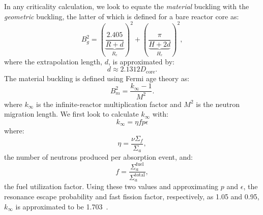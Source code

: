 \documentclass{anstrans}
\begin{document}
    In any criticality calculation, we look to equate the \textit{material} buckling with the \textit{geometric} buckling, the latter of which is defined for a bare reactor core as:
    \begin{equation}
        \label{geometric buckling}
        B_g^2 = \left( \frac{2.405}{\underbrace{R+d}_{R_e}} \right)^2 + \left( \frac{\pi }{\underbrace{H+2d}_{H_e}} \right)^2,
    \end{equation}
    where the extrapolation length, $d$, is approximated by:
    \begin{equation}
        \label{extrapolation length}
        d \approx 2.1312 D_{\text{core}}.
    \end{equation}
    The material buckling is defined using Fermi age theory as:
    \begin{equation}
        \label{material buckling}
        B_m^2 = \frac{k_{\infty }-1}{M^2}.
    \end{equation}
    where $k_{\infty}$ is the infinite-reactor multiplication factor and $M^2$ is the neutron migration length.
    We first look to calculate $k_{\infty}$ with:
    \begin{equation}
        \label{k inifinity}
        k_{\infty}= \eta f p \epsilon
    \end{equation}
    where:
    \begin{equation}
        \label{eta}
        \eta = \frac{\nu \Sigma_f }{\Sigma_a},
    \end{equation}
    the number of neutrons produced per absorption event, and:
    \begin{equation}
        \label{fuel uilization}
        f = \frac{\Sigma_a^{\text{fuel}}}{\Sigma_a^{\text{total}}},
    \end{equation}
    the fuel utilization factor.
    Using these two values and approximating $p$ and $\epsilon$, the resonance escape probability and fast fission factor, respectively, as 1.05 and 0.95, $k_{\infty}$ is approximated to be 1.703~\cite{lamarshIntroductionNuclearEngineering2001}.
\end{document}
